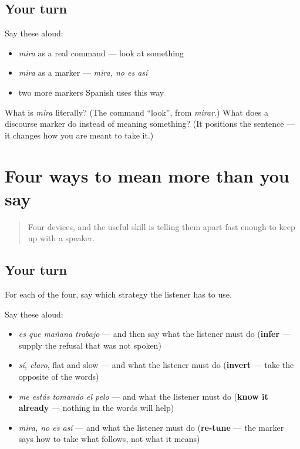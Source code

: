 \subsection*{Your turn}
Say these aloud:

\begin{itemize}
\raggedright
  \item \emph{mira} as a real command — look at something
  \item \emph{mira} as a marker — \emph{mira, no es así}
  \item two more markers Spanish uses this way
\end{itemize}

\begin{tcolorbox}[breakable,colback=teal!4,colframe=teal!35!black,title={Before you move on}]
What is \emph{mira} literally? (The command \textquotedblleft{}look\textquotedblright{}, from \emph{mirar}.) What does a discourse marker do instead of meaning something? (It positions the sentence — it changes how you are meant to take it.)
\end{tcolorbox}
\section[Practice]{Four ways to mean more than you say}

\label{lesson:ES-C272-practice}



\begin{quote}
Four devices, and the useful skill is telling them apart fast enough to keep up with a speaker.
\end{quote}

\subsection*{Your turn}
For each of the four, say which strategy the listener has to use.

Say these aloud:

\begin{itemize}
\raggedright
  \item \emph{es que mañana trabajo} — and then say what the listener must do (\textbf{infer} — supply the refusal that was not spoken)
  \item \emph{sí, claro}, flat and slow — and what the listener must do (\textbf{invert} — take the opposite of the words)
  \item \emph{me estás tomando el pelo} — and what the listener must do (\textbf{know it already} — nothing in the words will help)
  \item \emph{mira, no es así} — and what the listener must do (\textbf{re-tune} — the marker says how to take what follows, not what it means)
\end{itemize}

